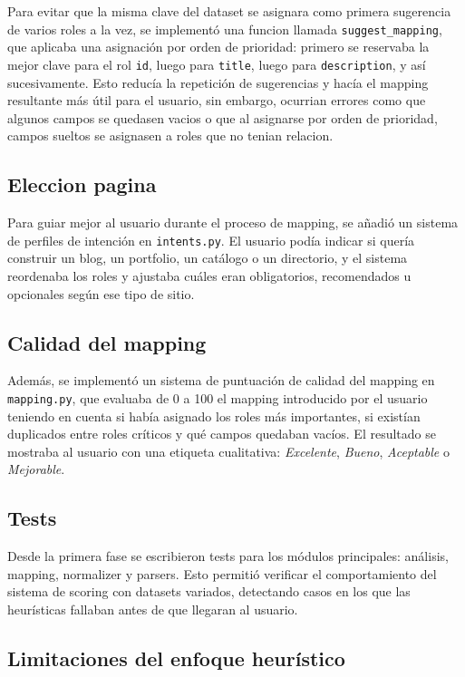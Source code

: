 Para evitar que la misma clave del dataset se asignara como primera sugerencia de varios roles a la vez, se implementó una funcion llamada \texttt{suggest\_mapping}, que aplicaba una asignación por orden de prioridad: primero se reservaba la mejor clave para el rol \texttt{id}, luego para \texttt{title}, luego para \texttt{description}, y así sucesivamente. Esto reducía la repetición de sugerencias y hacía el mapping resultante más útil para el usuario, sin embargo, ocurrian errores como que algunos campos se quedasen vacios o que al asignarse por orden de prioridad, campos sueltos se asignasen a roles
que no tenian relacion.

\subsection*{Eleccion pagina}
\label{subsec:eleccion-pagina}

Para guiar mejor al usuario durante el proceso de mapping, se añadió un sistema de perfiles de intención en \texttt{intents.py}. El usuario podía indicar si quería construir un blog, un portfolio, un catálogo o un directorio, y el sistema reordenaba los roles y ajustaba cuáles eran obligatorios, recomendados u opcionales según ese tipo de sitio.


\subsection*{Calidad del mapping}
\label{subsec:calidad-mapping}
Además, se implementó un sistema de puntuación de calidad del mapping en \texttt{mapping.py}, que evaluaba de 0 a 100 el mapping introducido por el usuario teniendo en cuenta si había asignado los roles más importantes, si existían duplicados entre roles críticos y qué campos quedaban vacíos. El resultado se mostraba al usuario con una etiqueta cualitativa: \emph{Excelente}, \emph{Bueno}, \emph{Aceptable} o \emph{Mejorable}.


\subsection*{Tests}
\label{subsec:test1}

Desde la primera fase se escribieron tests para los módulos principales: análisis, mapping, normalizer y parsers. Esto permitió verificar el 
comportamiento del sistema de scoring con datasets variados, detectando casos en los que las heurísticas fallaban antes de que llegaran al usuario.
\subsection*{Limitaciones del enfoque heurístico} \label{subsec:limitaciones1}

